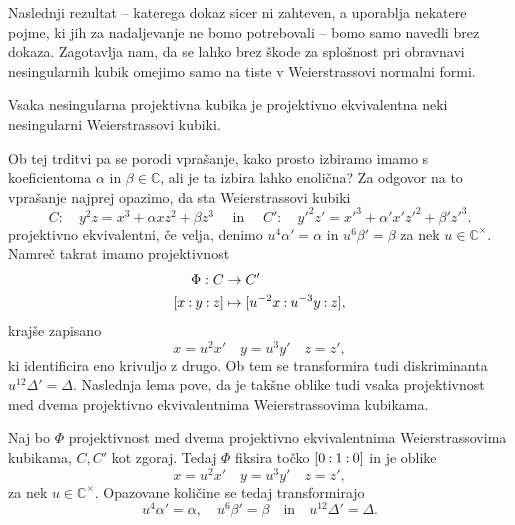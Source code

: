 \documentclass[mat1]{fmfdelo}
\newcommand{\C}{\mathbb C}
\newcommand{\CM}{\mathbb C ^\times}
\newcommand{\pcoor}[1]{%
  \begingroup\lccode`~=`: \lowercase{\endgroup
  \edef~}{\mathbin{\mathchar\the\mathcode`:}\nobreak}%
  [%
  \begingroup
  \mathcode`:=\string"8000
  #1%
  \endgroup
  ]%
}
\theoremstyle{definition}
\begin{document}
Naslednji rezultat -- katerega dokaz sicer ni zahteven, a uporablja nekatere pojme, ki jih za nadaljevanje ne bomo potrebovali -- bomo samo navedli brez dokaza. Zagotavlja nam, da se lahko brez škode za splošnost pri obravnavi nesingularnih kubik omejimo samo na tiste v Weierstrassovi normalni formi. 



\begin{trditev}
    \label{kubika izomorfna neki wnf}
    Vsaka nesingularna projektivna kubika je projektivno ekvivalentna neki nesingularni Weierstrassovi kubiki.  
\end{trditev}

\begin{dokaz}
    \cite[lemma 15.2]{Gibson}
\end{dokaz}

Ob tej trditvi pa se porodi vprašanje, kako prosto izbiramo imamo s koeficientoma $\alpha$ in $\beta \in \C$, ali je ta izbira lahko enolična? Za odgovor na to vprašanje najprej opazimo, da sta Weierstrassovi kubiki 
\[
    C: \quad y^2z = x^3 + \alpha xz^2 + \beta z^3 \quad \text{ in } \quad
    C': \quad y'^2z' = x'^3 + \alpha' x'z'^2 + \beta' z'^3. 
\]
projektivno ekvivalentni, če velja, denimo $u^4 \alpha' = \alpha$ in $u^6 \beta' = \beta$ za nek $u \in \CM$. Namreč takrat imamo projektivnost
\begin{align*}
    \Phi:C &\to C'\\
    \pcoor{x : y : z} &\mapsto \pcoor{u^{-2}x : u^{-3}y : z},
\end{align*}
krajše zapisano 
\[
    x = u^2 x' \quad y = u^3 y' \quad z = z',  
\]
ki identificira eno krivuljo z drugo. Ob tem se transformira tudi diskriminanta $u^{12} \Delta' = \Delta$. Naslednja lema pove, da je takšne oblike tudi vsaka projektivnost med dvema projektivno ekvivalentnima Weierstrassovima kubikama. 
        
\begin{lema}
    \label{projektivnosti wnf}
    Naj bo $\Phi$ projektivnost med dvema projektivno ekvivalentnima Weierstrassovima kubikama, $C, C'$ kot zgoraj. Tedaj $\Phi$ fiksira točko $\pcoor{0 : 1 : 0}$ in je oblike 
    \begin{equation}
        \label{eq:transformacija wnf}
        x = u^2 x' \quad y = u^3 y' \quad z = z',  
    \end{equation}
    za nek $u \in \CM$. Opazovane količine se tedaj transformirajo 
    \[
        u^4 \alpha' = \alpha, \quad u^6 \beta' = \beta \quad \text{in} \quad u^{12} \Delta' = \Delta.
    \]
\end{lema}
\end{document}
